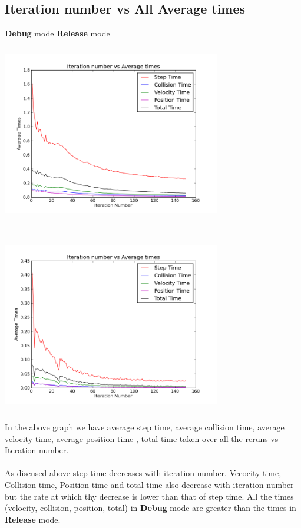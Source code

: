 \documentclass{article}
\begin{document}
\subsection{Iteration number vs All Average times}
\textbf{Debug} mode \hfill \textbf{Release} mode\\
\includegraphics[width=270pt,height=240pt]{g27_lab09_plot02_debug} \hfill  
\includegraphics[width=270pt,height=240pt]{g27_lab09_plot02_release}\\
In the above graph we have average step time, average collision time, average velocity time, average position time
, total time taken over all the reruns vs Iteration number.\\\\
As discused above step time decreases with iteration number.
Vecocity time, Collision time, Position time and total time also decrease with iteration number but the rate at which thy decrease is lower than 
that of step time.
All the times (velocity, collision, position, total) in \textbf{Debug} mode are greater than the times
 in \textbf{Release} mode.
\end{document}
